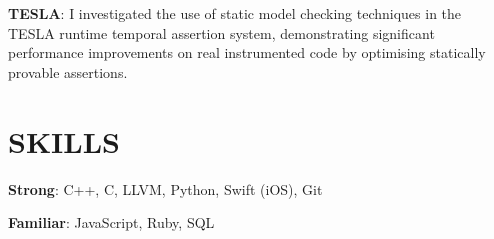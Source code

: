 \documentclass[margin]{res}
\begin{document}
\begin{resume}
\par
\textbf{TESLA}: I investigated the use of static model checking techniques in the TESLA runtime
temporal assertion system, demonstrating significant performance improvements on
real instrumented code by optimising statically provable assertions.


\section{SKILLS}

\textbf{Strong}: C++, C, LLVM, Python, Swift (iOS), Git

\textbf{Familiar}: JavaScript, Ruby, SQL


\end{resume}
\end{document}
